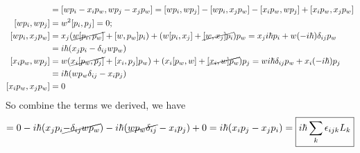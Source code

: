 \documentclass[../../main.tex]{subfiles}
\begin{document}
\begin{enumerate}
{{\begin{enumerate}
\begin{align*}
      [K_{i},K_{j}] &= [wp_{i}-x_{i}p_{w},wp_{j}-x_{j}p_{w}] = [wp_{i},wp_{j}] - [wp_{i},x_{j}p_{w}] - [x_{i}p_{w},wp_{j}] + [x_{i}p_{w},x_{j}p_{w}]\\
      [wp_{i},wp_{j}] &= w^{2}[p_{i},p_{j}] = 0;\\
      [wp_{i},x_{j}p_{w}] &= x_{j}(\cancel{w[p_{i},p_{w}]} + [w,p_{w}]p_{i}) + (w[p_{i},x_{j}] + \cancel{[w,x_{j}]p_{i}})p_{w} = x_{j} i\hbar p_{i} + w (-i\hbar)\delta_{ij}p_{w}\\
      & = i\hbar(x_{j}p_{i}-\delta_{ij}wp_{w})\\
      [x_{i}p_{w},wp_{j}] &= w(\cancel{x_{i}[p_{w},p_{j}]} + [x_{i},p_{j}]p_{w}) + (x_{i}[p_{w},w] + \cancel{[x_{i},w]p_{w}})p_{j} = w i\hbar \delta_{ij}p_{w} + x_{i}(-i\hbar)p_{j}\\
      &= i\hbar(wp_{w}\delta_{ij}-x_{i}p_{j})\\
      [x_{i}p_{w},x_{j}p_{w}] &= 0
    \end{align*}
    So combine the terms we derived, we have
    \begin{align*}
      [K_{i},K_{j}] = 0 - i\hbar(x_{j}p_{i}\cancel{-\delta_{ij}wp_{w}}) - i\hbar(\cancel{wp_{w}\delta_{ij}}-x_{i}p_{j}) + 0 = i\hbar (x_{i}p_{j}-x_{j}p_{i}) = \boxed{i\hbar\sum_{k}\epsilon_{ijk}L_{k}}
    \end{align*}
  \end{enumerate}}}
\end{enumerate}
\end{document}
